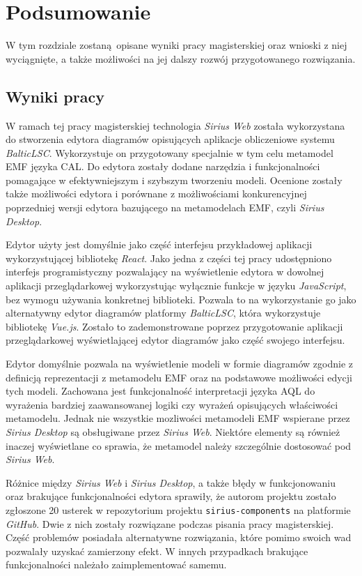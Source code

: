 \chapter{Podsumowanie}

W tym rozdziale zostaną opisane wyniki pracy magisterskiej oraz wnioski z niej
wyciągnięte, a także możliwości na jej dalszy rozwój przygotowanego
rozwiązania.

\section{Wyniki pracy}

W ramach tej pracy magisterskiej technologia \emph{Sirius Web} została
wykorzystana do stworzenia edytora diagramów opisujących aplikacje obliczeniowe
systemu \emph{BalticLSC}. Wykorzystuje on przygotowany specjalnie w tym celu
metamodel \gls{EMF} języka \gls{CAL}. Do edytora zostały dodane narzędzia i
funkcjonalności pomagające w efektywniejszym i szybszym tworzeniu modeli.
Ocenione zostały także możliwości edytora i porównane z możliwościami
konkurencyjnej poprzedniej wersji edytora bazującego na metamodelach \gls{EMF},
czyli \emph{Sirius Desktop}.

Edytor użyty jest domyślnie jako część interfejsu przykładowej aplikacji
wykorzystującej bibliotekę \emph{React}.
Jako jedna z części tej pracy udostępniono interfejs programistyczny
pozwalający na wyświetlenie edytora w dowolnej aplikacji przeglądarkowej
wykorzystując wyłącznie funkcje w języku \emph{JavaScript}, bez wymogu używania
konkretnej biblioteki.
Pozwala to na wykorzystanie go jako
alternatywny edytor diagramów platformy \emph{BalticLSC}, która wykorzystuje
bibliotekę \emph{Vue.js}. Zostało to
zademonstrowane poprzez przygotowanie aplikacji przeglądarkowej wyświetlającej
edytor diagramów jako część swojego interfejsu.

Edytor domyślnie pozwala na wyświetlenie modeli w formie diagramów zgodnie z
definicją reprezentacji z metamodelu \gls{EMF} oraz na podstawowe możliwości
edycji tych modeli. Zachowana jest funkcjonalność interpretacji języka
\gls{AQL} do wyrażenia bardziej zaawansowanej logiki czy wyrażeń opisujących
właściwości metamodelu. Jednak nie wszystkie mozliwości metamodeli \gls{EMF}
wspierane przez \emph{Sirius Desktop} są obsługiwane przez \emph{Sirius Web}.
Niektóre elementy są również inaczej wyświetlane co sprawia, że metamodel
należy szczególnie dostosować pod \emph{Sirius Web}.

Różnice między \emph{Sirius Web} i \emph{Sirius Desktop}, a także błędy w
funkcjonowaniu oraz brakujące funkcjonalności edytora sprawiły, że autorom
projektu zostało zgłoszone 20 usterek w repozytorium projektu
\texttt{sirius-components} na platformie \emph{GitHub}. Dwie z nich zostały
rozwiązane podczas pisania pracy magisterskiej. Część problemów posiadała
alternatywne rozwiązania, które pomimo swoich wad pozwalały uzyskać zamierzony
efekt. W innych przypadkach brakujące funkcjonalności należało zaimplementować
samemu.

